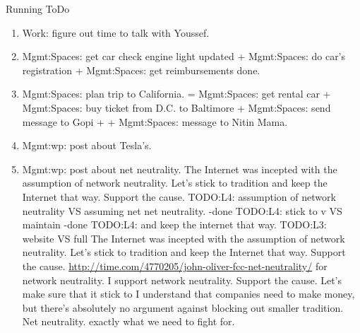 \begin{columns}
\begin{column}{0.6\linewidth}
\begin{block}{Running ToDo}
\begin{enumerate}
          \item \tiny Work: figure out time to talk with Youssef. 
          \item \tiny Mgmt:Spaces: get car check engine light updated
            + Mgmt:Spaces: do car's registration + Mgmt:Spaces: get
            reimbursements done.
          \item \tiny Mgmt:Spaces: plan trip  to California. = 
            Mgmt:Spaces: get rental car + Mgmt:Spaces: buy ticket from
            D.C. to Baltimore 
              + Mgmt:Spaces: send message to Gopi + 
             +
            Mgmt:Spaces: message to Nitin Mama. 

           \item \tiny Mgmt:wp: post about Tesla's. 
            \item \tiny Mgmt:wp: post about net neutrality. 
            The Internet was incepted with the assumption of network
            neutrality. Let's stick to tradition and keep the Internet
            that way. Support the cause.
            TODO:L4: assumption of network neutrality VS assuming net
            net neutrality.  -done 
            TODO:L4: stick to v VS maintain  -done 
            TODO:L4: and keep the internet that way. 
            TODO:L3: website VS full
            The Internet was incepted with the assumption of network neutrality. Let's stick to tradition and keep the Internet that way. Support the
            cause. \url{http://time.com/4770205/john-oliver-fcc-net-neutrality/} for network neutrality. 
            I support network neutrality.
            Support the cause. 
            Let's make sure that it stick to  I understand that
            companies need to make money, but there's absolutely no
            argument against blocking out smaller tradition.  Net
            neutrality. exactly what we need to fight for.
            

\end{enumerate}
\end{block}
\end{column}
\end{columns}
